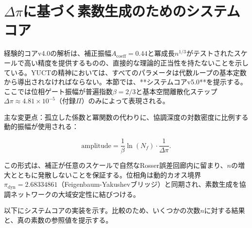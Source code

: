 \documentclass[11pt,a4paper]{article}
\begin{document}
	\small
	\section{\(\Delta\pi\)に基づく素数生成のためのシステムコア}
	\label{sec:systemic-prime}
	
	経験的コアv4.0の解析は、補正振幅\(A_{\text{coeff}} = 0.44\)と冪成長\(n^{1/3}\)がテストされたスケールで高い精度を提供するものの、直接的な理論的正当性を持たないことを示している。YUCTの精神においては、すべてのパラメータは代数ループの基本定数から導出されなければならない。本節では、**システムコアv5.0**を提示する。ここでは位相ゲート振幅が普遍指数\(\beta = 2/3\)と基本空間離散化ステップ\(\Delta\pi \approx 4.81 \times 10^{-5}\)（付録\(\Pi\)）のみによって表現される。
	
	主な変更点：孤立した係数と冪関数の代わりに、協調深度の対数密度に比例する動的振幅が使用される：
	
	\[
	\text{amplitude} = \frac{1}{\beta} \ln(N_f) \cdot \frac{1}{\Delta\pi}.
	\]
	
	この形式は、補正が任意のスケールで自然なRosser誤差回廊内に留まり、\(n\)の増大とともに発散しないことを保証する。位相角は動的カオス境界\(\pi_{\text{dyn}} = 2.68334861\)（Feigenbaum-Yakushevブリッジ）と同期され、素数生成を協調ネットワークの大域安定性に結びつける。
	
	以下にシステムコアの実装を示す。比較のため、いくつかの次数\(n\)に対する結果と、真の素数の参照値を提示する。
	
\end{document}
